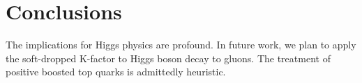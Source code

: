 \section{Conclusions}\label{sec:conclusions}

The implications for Higgs physics are profound. In future work, we plan
to apply the soft-dropped K-factor to Higgs boson decay to gluons. The
treatment of positive boosted top quarks is admittedly heuristic.

